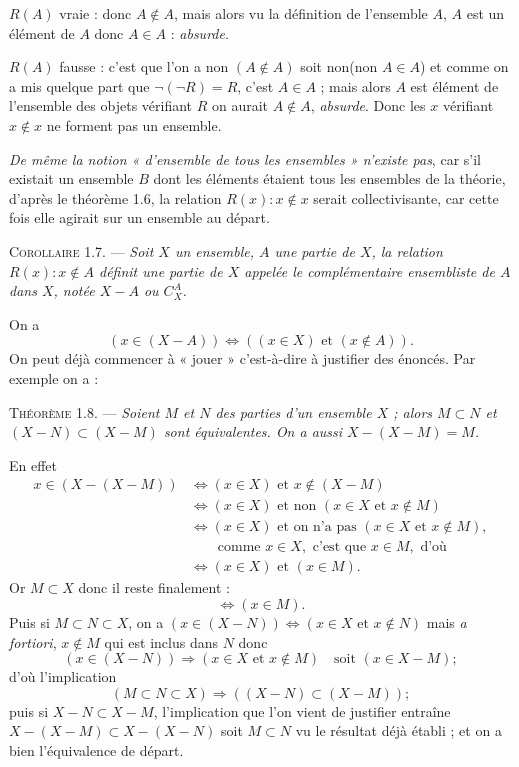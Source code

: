 \begin{description}[leftmargin=6em,labelwidth=5.2em,labelsep=.7em,font=\itshape]
\item[1\textsuperscript{er} cas] $R(A)$ vraie : donc $A\notin A$, mais alors vu la définition de l'ensemble $A$, $A$ est un élément de $A$ donc $A\in A$ : \emph{absurde}.
\item[2\textsuperscript{e} cas] $R(A)$ fausse : c'est que l'on a non $(A\notin A)$ soit non(non $A\in A$) et comme on a mis quelque part que $\neg(\neg R)=R$, c'est $A\in A$ ; mais alors $A$ est élément de l'ensemble des objets vérifiant $R$ on aurait $A\notin A$, \emph{absurde}. Donc les $x$ vérifiant $x\notin x$ ne forment pas un ensemble.
\end{description}

\emph{De même la notion « d'ensemble de tous les ensembles » n'existe pas}, car s'il existait un ensemble $B$ dont les éléments étaient tous les ensembles de la théorie, d'après le théorème 1.6, la relation $R(x):x\notin x$ serait collectivisante, car cette fois elle agirait sur un ensemble au départ.

\medskip\noindent\textsc{Corollaire 1.7.} --- \emph{Soit $X$ un ensemble, $A$ une partie de $X$, la relation $R(x):x\notin A$ définit une partie de $X$ appelée le complémentaire ensembliste de $A$ dans $X$, notée $X-A$ ou $C_X^A$.}

On a
\[
(x\in(X-A))\Leftrightarrow((x\in X)\text{ et }(x\notin A)).
\]
On peut déjà commencer à « jouer » c'est-à-dire à justifier des énoncés. Par exemple on a :

\medskip\noindent\textsc{Théorème 1.8.} --- \emph{Soient $M$ et $N$ des parties d'un ensemble $X$ ; alors $M\subset N$ et $(X-N)\subset(X-M)$ sont équivalentes. On a aussi $X-(X-M)=M$.}

En effet
\begin{align*}
x\in(X-(X-M))
&\Leftrightarrow (x\in X)\text{ et }x\notin(X-M)\\
&\Leftrightarrow (x\in X)\text{ et non }(x\in X\text{ et }x\notin M)\\
&\Leftrightarrow (x\in X)\text{ et on n'a pas }(x\in X\text{ et }x\notin M),\\
&\qquad\text{comme }x\in X,\text{ c'est que }x\in M,\text{ d'où}\\
&\Leftrightarrow (x\in X)\text{ et }(x\in M).
\end{align*}
Or $M\subset X$ donc il reste finalement :
\[
\Leftrightarrow(x\in M).
\]
Puis si $M\subset N\subset X$, on a $(x\in(X-N))\Leftrightarrow(x\in X\text{ et }x\notin N)$ mais \emph{a fortiori}, $x\notin M$ qui est inclus dans $N$ donc
\[
(x\in(X-N))\Rightarrow(x\in X\text{ et }x\notin M)\quad\text{soit }(x\in X-M);
\]
d'où l'implication
\[
(M\subset N\subset X)\Rightarrow((X-N)\subset(X-M));
\]
puis si $X-N\subset X-M$, l'implication que l'on vient de justifier entraîne $X-(X-M)\subset X-(X-N)$ soit $M\subset N$ vu le résultat déjà établi ; et on a bien l'équivalence de départ. \bookend

